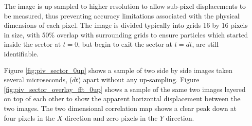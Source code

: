 The image is 
up sampled to higher resolution to allow sub-pixel displacements to be 
measured, thus preventing accuracy limitations associated with the physical 
dimensions of each pixel. The image is divided typically into grids 16 by 16 
pixels in size, with 50\% overlap with surrounding grids to ensure particles 
which started inside the sector at $t=0$, but begin to exit the sector at 
$t=dt$, are still identifiable.  


Figure \ref{fig:piv_sector_0up} shows a sample of two side by side images taken 
several microseconds, ($dt$) apart without any up-sampling. Figure 
\ref{fig:piv_sector_overlay_fft_0up} shows a sample of the same two images 
layered on top of each other to show the apparent horizontal displacement 
between the two images. The two dimensional correlation map shows a clear peak 
down at four pixels in the $X$ direction and zero pixels in the $Y$ direction.


